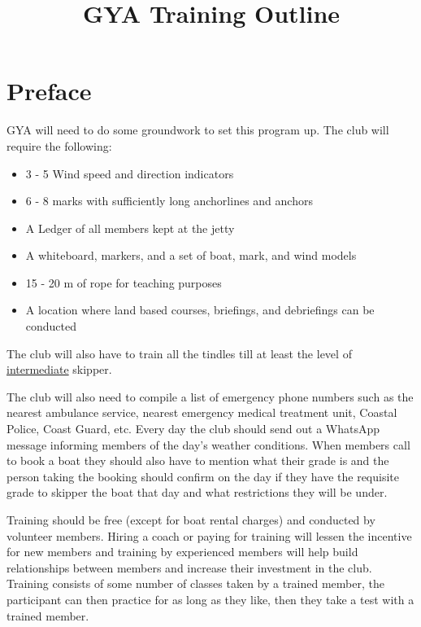 \documentclass[12pt]{scrartcl}
\title{GYA Training Outline}
\date{}
\begin{document}
\maketitle

\thispagestyle{empty}

\tableofcontents

\newpage

\section{Preface} \label{sec:preface}

GYA will need to do some groundwork to set this program up. The club will require the following:

\label{list:club requirements}
\begin{itemize}
	\item 3 - 5 Wind speed and direction indicators
	\item 6 - 8 marks with sufficiently long anchorlines and anchors
	\item A Ledger of all members kept at the jetty
	\item A whiteboard, markers, and a set of boat, mark, and wind models
	\item 15 - 20 m of rope for teaching purposes
	\item A location where land based courses, briefings, and debriefings can be conducted
\end{itemize}

The club will also have to train all the tindles till at least the level of \hyperlink{grade:intermediate}{intermediate} skipper.

The club will also need to compile a list of emergency phone numbers such as the nearest ambulance service, nearest emergency medical treatment unit, Coastal Police, Coast Guard, etc. Every day the club should send out a WhatsApp message informing members of the day’s weather conditions. When members call to book a boat they should also have to mention what their grade is and the person taking the booking should confirm on the day if they have the requisite grade to skipper the boat that day and what restrictions they will be under.

Training should be free (except for boat rental charges) and conducted by volunteer members. Hiring a coach or paying for training will lessen the incentive for new members and training by experienced members will help build relationships between members and increase their investment in the club. Training consists of some number of classes taken by a trained member, the participant can then practice for as long as they like, then they take a test with a trained member.
\end{document}

